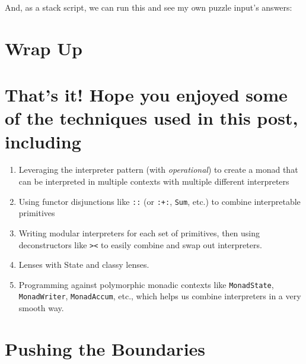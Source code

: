 \documentclass[]{article}
\newenvironment{Shaded}{}{}
\newcommand{\ExtensionTok}[1]{#1}
\newcommand{\NormalTok}[1]{#1}
\begin{document}
And, as a stack script, we can run this and see my own puzzle input's answers:

\begin{Shaded}
\end{Shaded}

\hypertarget{wrap-up}{%
\section{Wrap Up}\label{wrap-up}}

\hypertarget{thats-it-hope-you-enjoyed-some-of-the-techniques-used-in-this-post-including}{%
\section{That's it! Hope you enjoyed some of the techniques used in this post,
including}\label{thats-it-hope-you-enjoyed-some-of-the-techniques-used-in-this-post-including}}

\begin{enumerate}
\def\labelenumi{\arabic{enumi}.}
\tightlist
\item
  Leveraging the interpreter pattern (with \emph{operational}) to create a monad
  that can be interpreted in multiple contexts with multiple different
  interpreters
\item
  Using functor disjunctions like \texttt{:\textbar{}:} (or \texttt{:+:},
  \texttt{Sum}, etc.) to combine interpretable primitives
\item
  Writing modular interpreters for each set of primitives, then using
  deconstructors like \texttt{\textgreater{}\textbar{}\textless{}} to easily
  combine and swap out interpreters.
\item
  Lenses with State and classy lenses.
\item
  Programming against polymorphic monadic contexts like \texttt{MonadState},
  \texttt{MonadWriter}, \texttt{MonadAccum}, etc., which helps us combine
  interpreters in a very smooth way.
\end{enumerate}

\hypertarget{pushing-the-boundaries}{%
\section{Pushing the Boundaries}\label{pushing-the-boundaries}}
\end{document}
